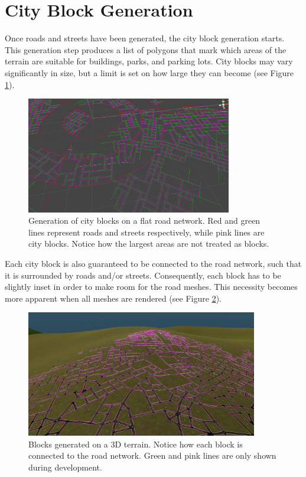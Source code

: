 \section{City Block Generation}

Once roads and streets have been generated, the city block generation starts.
This generation step produces a list of polygons that mark which areas of the terrain are suitable for buildings, parks, and parking lots.
City blocks may vary significantly in size, but a limit is set on how large they can become (see Figure \ref{fig:results_blockgen1}).

\begin{figure}[h!]
  \centering

  \includegraphics[width=0.8\textwidth]{figure/results_blockgen1.png}
  \caption{Generation of city blocks on a flat road network. Red and green lines represent roads and streets respectively, while pink lines are city blocks. Notice how the largest areas are not treated as blocks.}

  \label{fig:results_blockgen1}
\end{figure}

Each city block is also guaranteed to be connected to the road network, such that it is surrounded by roads and/or streets.
Consequently, each block has to be slightly inset in order to make room for the road meshes.
This necessity becomes more apparent when all meshes are rendered (see Figure \ref{fig:results_blockgen2}).

\begin{figure}[h!]
  \centering

  \includegraphics[width=0.9\textwidth]{figure/results_blockgen2.png}
  \caption{Blocks generated on a 3D terrain. Notice how each block is connected to the road network. Green and pink lines are only shown during development.}

  \label{fig:results_blockgen2}
\end{figure}

